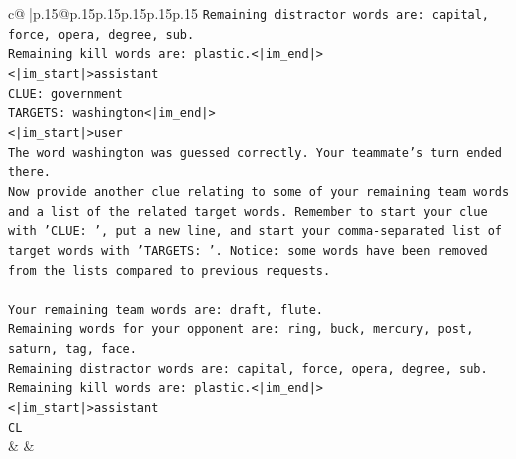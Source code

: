 \documentclass{article}
\begin{document}
{\begin{supertabular}{c@{$\;$}|p{.15\linewidth}@{}p{.15\linewidth}p{.15\linewidth}p{.15\linewidth}p{.15\linewidth}p{.15\linewidth}}
{{{\texttt{Remaining distractor words are: capital, force, opera, degree, sub.} \\
\texttt{Remaining kill words are: plastic.<|im\_end|>} \\
\texttt{<|im\_start|>assistant} \\
\texttt{CLUE: government} \\
\texttt{TARGETS: washington<|im\_end|>} \\
\texttt{<|im\_start|>user} \\
\texttt{The word washington was guessed correctly. Your teammate's turn ended there.} \\
\texttt{Now provide another clue relating to some of your remaining team words and a list of the related target words. Remember to start your clue with 'CLUE: ', put a new line, and start your comma{-}separated list of target words with 'TARGETS: '. Notice: some words have been removed from the lists compared to previous requests.} \\
\\ 
\texttt{Your remaining team words are: draft, flute.} \\
\texttt{Remaining words for your opponent are: ring, buck, mercury, post, saturn, tag, face.} \\
\texttt{Remaining distractor words are: capital, force, opera, degree, sub.} \\
\texttt{Remaining kill words are: plastic.<|im\_end|>} \\
\texttt{<|im\_start|>assistant} \\
\texttt{CL} \\
            }
        }
    }
    & & \\ \\


\end{supertabular}}
\end{document}
